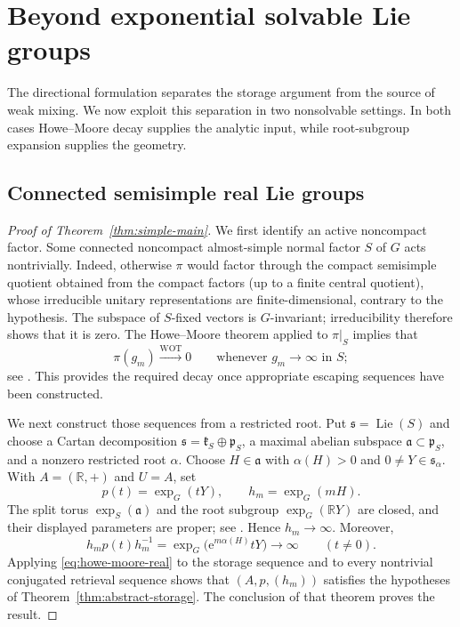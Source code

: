 \documentclass[reqno]{amsart}
\numberwithin{equation}{section}
\theoremstyle{definition}
\theoremstyle{remark}
\newcommand{\R}{\mathbb R}
\newcommand{\e}{\mathrm e}
\begin{document}
\section{Beyond exponential solvable Lie groups}
\label{sec:beyond-exponential}

The directional formulation separates the storage argument from the source
of weak mixing.  We now exploit this separation in two nonsolvable settings.
In both cases Howe--Moore decay supplies the analytic input, while
root-subgroup expansion supplies the geometry.

\subsection{Connected semisimple real Lie groups}

\begin{proof}[Proof of Theorem~\ref{thm:simple-main}]
We first identify an active noncompact factor.  Some connected noncompact
almost-simple normal factor $S$ of $G$ acts
nontrivially.  Indeed, otherwise $\pi$ would factor through the compact
semisimple quotient obtained from the compact factors (up to a finite central
quotient), whose irreducible unitary representations are finite-dimensional,
contrary to the hypothesis.  The subspace of $S$-fixed vectors
is $G$-invariant; irreducibility therefore shows that it is zero.  The
Howe--Moore theorem applied to $\pi|_S$ implies that
\begin{equation}\label{eq:howe-moore-real}
 \pi(g_m)\xrightarrow{\mathrm{WOT}}0
 \qquad\text{whenever }g_m\longrightarrow\infty\text{ in }S;
\end{equation}
see \cite{HoweMoore1979}.  This provides the required decay once appropriate
escaping sequences have been constructed.

We next construct those sequences from a restricted root.  Put
$\mathfrak s=\operatorname{Lie}(S)$ and choose a Cartan decomposition
$\mathfrak s=\mathfrak k_S\oplus\mathfrak p_S$, a maximal abelian subspace
$\mathfrak a\subset\mathfrak p_S$, and a nonzero
restricted root $\alpha$.  Choose $H\in\mathfrak a$ with $\alpha(H)>0$ and
$0\neq Y\in\mathfrak s_\alpha$.  With $A=(\R,+)$ and $U=A$, set
\[
 p(t)=\exp_G(tY),\qquad h_m=\exp_G(mH).
\]
The split torus $\exp_S(\mathfrak a)$ and the root subgroup
$\exp_G(\R Y)$ are closed, and their displayed parameters are proper; see
\cite[Chapter~VI]{Knapp2002}.  Hence $h_m\to\infty$.  Moreover,
\begin{equation}\label{eq:restricted-root-expansion}
 h_mp(t)h_m^{-1}
 =\exp_G\bigl(\e^{m\alpha(H)}tY\bigr)\longrightarrow\infty
 \qquad(t\neq0).
\end{equation}
Applying \eqref{eq:howe-moore-real} to the storage sequence and to every
nontrivial conjugated retrieval sequence shows that
$(A,p,(h_m))$ satisfies the hypotheses of
Theorem~\ref{thm:abstract-storage}.  The conclusion of that theorem proves
the result.
\end{proof}
\end{document}
